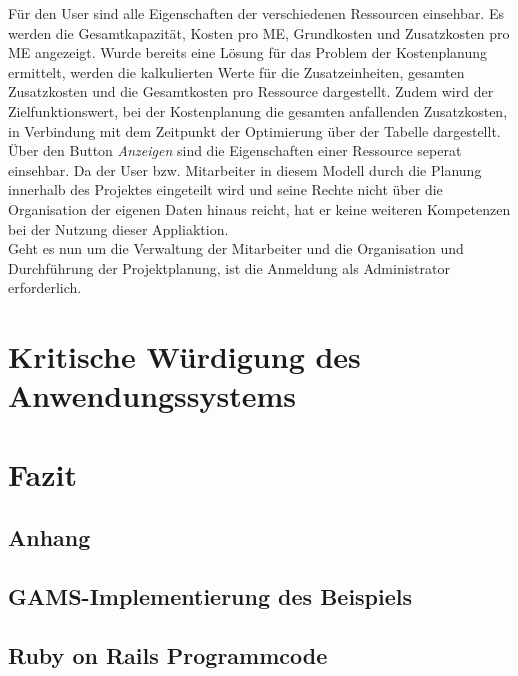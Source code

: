 \documentclass[a4paper,12pt,parskip,bibtotoc,liststotoc]{article}
\begin{document}
Für den User sind alle Eigenschaften der verschiedenen Ressourcen einsehbar. Es werden die Gesamtkapazität, Kosten pro ME, Grundkosten und Zusatzkosten pro ME angezeigt. Wurde bereits eine Lösung für das Problem der Kostenplanung ermittelt, werden die kalkulierten Werte für die Zusatzeinheiten, gesamten Zusatzkosten und die Gesamtkosten pro Ressource dargestellt. Zudem wird der Zielfunktionswert, bei der Kostenplanung die gesamten anfallenden Zusatzkosten, in Verbindung mit dem Zeitpunkt der Optimierung über der Tabelle dargestellt. Über den Button \textit{Anzeigen} sind die Eigenschaften einer Ressource seperat einsehbar. Da der User bzw. Mitarbeiter in diesem Modell durch die Planung innerhalb des Projektes eingeteilt wird und seine Rechte nicht über die Organisation der eigenen Daten hinaus reicht, hat er keine weiteren Kompetenzen bei der Nutzung dieser Appliaktion. \\

Geht es nun um die Verwaltung der Mitarbeiter und die Organisation und Durchführung der Projektplanung, ist die Anmeldung als Administrator erforderlich.         
   

%



\section{Kritische Würdigung des Anwendungssystems} \label{krit}

\section{Fazit} \label{Fazit}

\newpage

\newpage
%
%
\begin{appendix}
\section{Anhang}

\subsection{GAMS-Implementierung des Beispiels}\label{Imp}

\subsection{Ruby on Rails Programmcode}\label{Anhang2}


\end{appendix}
\end{document}
